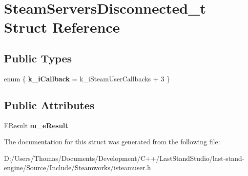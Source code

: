 \hypertarget{structSteamServersDisconnected__t}{}\section{Steam\+Servers\+Disconnected\+\_\+t Struct Reference}
\label{structSteamServersDisconnected__t}
\subsection*{Public Types}
\begin{DoxyCompactItemize}
\item 
\hypertarget{structSteamServersDisconnected__t_aa8883e0397d871d6aecb794dcb4db810}{}enum \{ {\bfseries k\+\_\+i\+Callback} = k\+\_\+i\+Steam\+User\+Callbacks + 3
 \}\label{structSteamServersDisconnected__t_aa8883e0397d871d6aecb794dcb4db810}

\end{DoxyCompactItemize}
\subsection*{Public Attributes}
\begin{DoxyCompactItemize}
\item 
\hypertarget{structSteamServersDisconnected__t_a920d125eed83d1fa0d29594cf61f3837}{}E\+Result {\bfseries m\+\_\+e\+Result}\label{structSteamServersDisconnected__t_a920d125eed83d1fa0d29594cf61f3837}

\end{DoxyCompactItemize}


The documentation for this struct was generated from the following file\+:\begin{DoxyCompactItemize}
\item 
D\+:/\+Users/\+Thomas/\+Documents/\+Development/\+C++/\+Last\+Stand\+Studio/last-\/stand-\/engine/\+Source/\+Include/\+Steamworks/isteamuser.\+h\end{DoxyCompactItemize}
